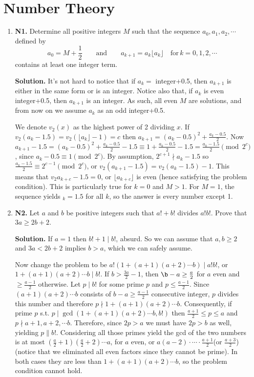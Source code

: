 \documentclass[11pt,a4paper]{article}
\begin{document}
\section{Number Theory}
\begin{enumerate}
\item\textbf{N1.} Determine all positive integers $M$ such that the sequence $a_0, a_1, a_2, \cdots$ defined by \[ a_0 = M + \frac{1}{2} \qquad \textrm{and} \qquad a_{k+1} = a_k\lfloor a_k \rfloor \quad \textrm{for} \, k = 0, 1, 2, \cdots \]contains at least one integer term.

\textbf{Solution.} It's not hard to notice that if $a_k=$ integer+0.5, then $a_{k+1}$ is either in the same form or is an integer. Notice also that, if $a_k$ is even integer+0.5, then $a_{k+1}$ is an integer. As such, all even $M$ are solutions, and from now on we assume $a_k$ as an odd integer+0.5. 

We denote $v_{2}(x)$ as the highest power of 2 dividing $x$. If $v_2(a_k-1.5)=v_2(\lfloor a_k\rfloor -1)=c$ then $a_{k+1}=(a_k-0.5)^2+\frac{a_k-0.5}{2}$. Now $a_{k+1}-1.5=(a_k-0.5)^2+\frac{a_k-0.5}{2}-1.5\equiv 1+\frac{a_k-0.5}{2}-1.5=\frac{a_k-1.5}{2}\pmod {2^c}$, since $a_k-0.5\equiv 1\pmod{2^c}$. By assumption, $2^{c+1}\nmid a_k-1.5$ so $\frac{a_k-1.5}{2}\equiv 2^{c-1}\pmod {2^c}$, or $v_2(a_{k+1}-1.5)=v_2(a_k-1.5)-1.$ This means that $v_2{a_{k+c}-1.5}=0$, or $\lfloor a_{k+c} \rfloor$ is even (hence satisfying the problem condition). This is particularly true for $k=0$ and $M>1$. For $M=1$, the sequence yields $_k=1.5$ for all $k$, so the answer is every number except 1.

\item\textbf{N2.} Let $a$ and $b$ be positive integers such that $a! + b!$ divides $a!b!$. Prove that $3a \ge 2b + 2$.

\textbf{Solution.} If $a=1$ then $b!+1\mid b!$, absurd. So we can assume that $a,b\ge 2$ and $3a< 2b+2$ implies $b>a$, which we can safely assume.

Now change the problem to be $a!(1+(a+1)(a+2)\cdots b)\mid a!b!$, or $1+(a+1)(a+2)\cdots b\mid b!$. If $b>\frac{3a}{2}-1$, then $\b-a\ge\frac{a}{2}$ for $a$ even and $\ge\frac{a-1}{2}$ otherwise. Let $p\mid b!$ for some prime $p$ and $p\le\frac{a-1}{2}$. Since $(a+1)(a+2)\cdots b$ consists of $b-a\ge\frac{a-1}{2}$ consecutive integer, $p$ divides this number and therefore $p\nmid 1+(a+1)(a+2)\cdots b$. Consequently, if prime $p$ s.t. $p\mid\gcd(1+(a+1)(a+2)\cdots b, b!)$ then $\frac{a+1}{2}\le p\le a$ and $p\nmid a+1, a+2,\cdots b$. Therefore, since $2p>a$ we must have $2p>b$ as well, yielding $p\parallel b!$. Considering all those primes yield the gcd of the two numbers is at most $(\frac{a}{2}+1)(\frac{a}{2}+2)\cdots a$, for $a$ even, or $a(a-2)\cdot\cdots\cdot\frac{a+1}{2}$(or $\frac{a+3}{2}$) (notice that we eliminated all even factors since they cannot be prime). In both cases they are less than $1+(a+1)(a+2)\cdots b$, so the problem condition cannot hold.


\end{enumerate}
\end{document}
